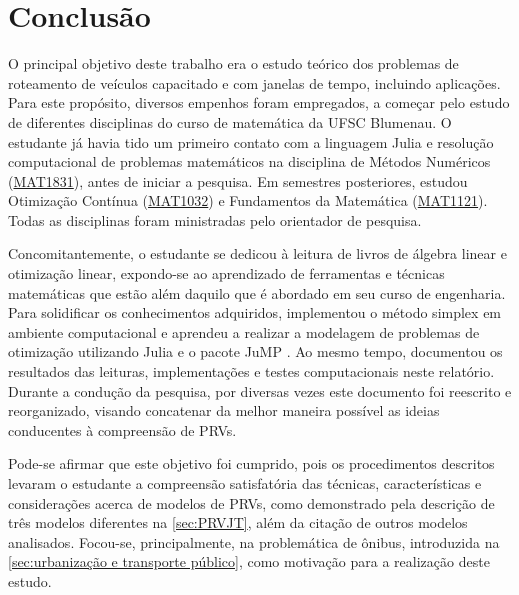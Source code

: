 \section{Conclusão}\label{sec:conclusão}
O principal objetivo deste trabalho era o estudo teórico dos problemas de roteamento de veículos capacitado e com janelas de tempo, incluindo aplicações. Para este propósito, diversos empenhos foram empregados, a começar pelo estudo de diferentes disciplinas do curso de matemática da UFSC Blumenau. O estudante já havia tido um primeiro contato com a linguagem Julia e resolução computacional de problemas matemáticos na disciplina de Métodos Numéricos (\href{https://dmatbnu.paginas.ufsc.br/files/2021/05/MAT1831-08751-M\%C3\%A9todos_Num\%C3\%A9ricos_Plano_de_ensino_2021_1_MTM.pdf}{MAT1831}), antes de iniciar a pesquisa. Em semestres posteriores, estudou Otimização Contínua (\href{https://dmatbnu.paginas.ufsc.br/files/2022/03/1647624179733_MAT1032-Plano_de_Ensino_2022_1_Otimizacao_Continua.pdf}{MAT1032}) e Fundamentos da Matemática (\href{https://dmatbnu.paginas.ufsc.br/files/2022/07/MAT1121-Plano_de_Ensino_2022_2_Fundamentos_Matema\%CC\%81tica-MAT.pdf}{MAT1121}). Todas as disciplinas foram ministradas pelo orientador de pesquisa.

Concomitantemente, o estudante se dedicou à leitura de livros de álgebra linear e otimização linear, expondo-se ao aprendizado de ferramentas e técnicas matemáticas que estão além daquilo que é abordado em seu curso de engenharia. Para solidificar os conhecimentos adquiridos, implementou o método simplex em ambiente computacional \cite{Centenaro:23} e aprendeu a realizar a modelagem de problemas de otimização utilizando Julia \cite{JULIA} e o pacote JuMP \cite{JuMP}. Ao mesmo tempo, documentou os resultados das leituras, implementações e testes computacionais neste relatório. Durante a condução da pesquisa, por diversas vezes este documento foi reescrito e reorganizado, visando concatenar da melhor maneira possível as ideias conducentes à compreensão de PRVs.

Pode-se afirmar que este objetivo foi cumprido, pois os procedimentos descritos levaram o estudante a compreensão satisfatória das técnicas, características e considerações acerca de modelos de PRVs, como demonstrado pela descrição de três modelos diferentes na \cref{sec:PRVJT}, além da citação de outros modelos analisados. Focou-se, principalmente, na problemática de ônibus, introduzida na \cref{sec:urbanização e transporte público}, como motivação para a realização deste estudo.

